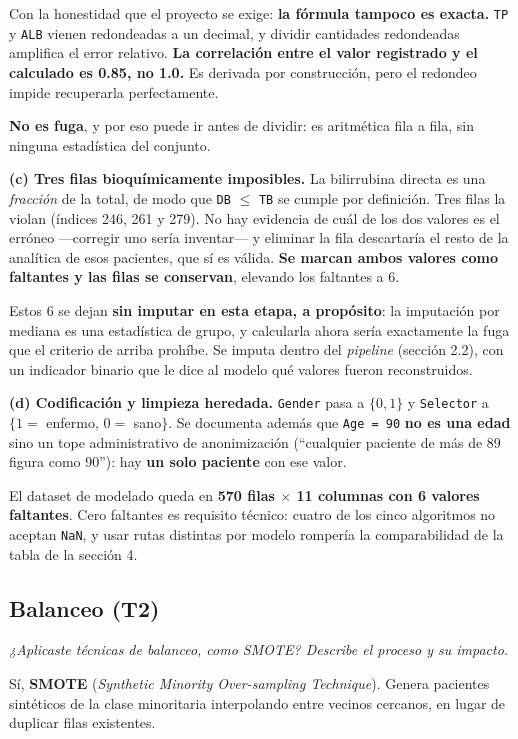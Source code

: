 \documentclass[10pt,a4paper]{article}
\begin{document}
Con la honestidad que el proyecto se exige: \textbf{la fórmula tampoco es exacta.} \texttt{TP} y \texttt{ALB} vienen redondeadas a un decimal, y dividir cantidades redondeadas amplifica el error relativo. \textbf{La correlación entre el valor registrado y el calculado es 0.85, no 1.0.} Es derivada por construcción, pero el redondeo impide recuperarla perfectamente.

\textbf{No es fuga}, y por eso puede ir antes de dividir: es aritmética fila a fila, sin ninguna estadística del conjunto.

\textbf{(c) Tres filas bioquímicamente imposibles.} La bilirrubina directa es una \textit{fracción} de la total, de modo que \texttt{DB} $\leq$ \texttt{TB} se cumple por definición. Tres filas la violan (índices 246, 261 y 279). No hay evidencia de cuál de los dos valores es el erróneo ---corregir uno sería inventar--- y eliminar la fila descartaría el resto de la analítica de esos pacientes, que sí es válida. \textbf{Se marcan ambos valores como faltantes y las filas se conservan}, elevando los faltantes a 6.

Estos 6 se dejan \textbf{sin imputar en esta etapa, a propósito}: la imputación por mediana es una estadística de grupo, y calcularla ahora sería exactamente la fuga que el criterio de arriba prohíbe. Se imputa dentro del \textit{pipeline} (sección 2.2), con un indicador binario que le dice al modelo qué valores fueron reconstruidos.

\textbf{(d) Codificación y limpieza heredada.} \texttt{Gender} pasa a $\{0, 1\}$ y \texttt{Selector} a $\{1 =$ enfermo, $0 =$ sano$\}$. Se documenta además que \texttt{Age = 90} \textbf{no es una edad} sino un tope administrativo de anonimización (``cualquier paciente de más de 89 figura como 90''): hay \textbf{un solo paciente} con ese valor.

El dataset de modelado queda en \textbf{570 filas $\times$ 11 columnas con 6 valores faltantes}. Cero faltantes es requisito técnico: cuatro de los cinco algoritmos no aceptan \texttt{NaN}, y usar rutas distintas por modelo rompería la comparabilidad de la tabla de la sección 4.

\subsection{Balanceo (T2)}

\textit{¿Aplicaste técnicas de balanceo, como SMOTE? Describe el proceso y su impacto.}

Sí, \textbf{SMOTE} (\textit{Synthetic Minority Over-sampling Technique}). Genera pacientes sintéticos de la clase minoritaria interpolando entre vecinos cercanos, en lugar de duplicar filas existentes.
\end{document}
